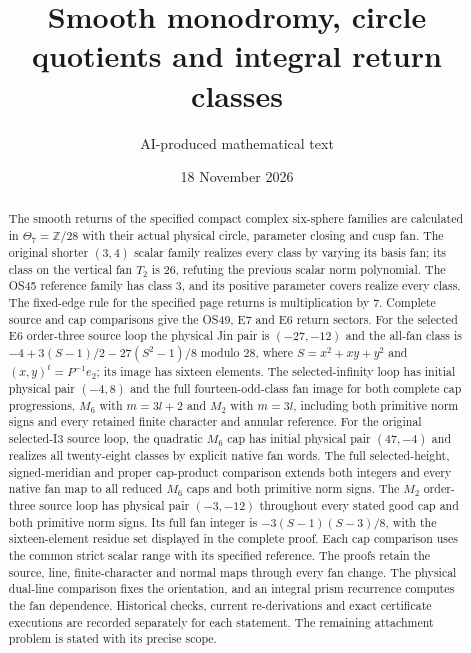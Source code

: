 \title{Smooth monodromy, circle quotients and integral return classes}
\author{AI-produced mathematical text}
\date{18 November 2026}
\maketitle

\begin{abstract}
The smooth returns of the specified compact complex six-sphere
families are calculated in $\Theta_7=\mathbb Z/28$ with their actual
physical circle, parameter closing and cusp fan. The original
shorter $(3,4)$ scalar family realizes every class by varying its
basis fan; its class on the vertical fan $T_2$ is $26$, refuting the
previous scalar norm polynomial. The OS45 reference family has
class $3$, and its positive parameter covers realize every class.
The fixed-edge rule for the specified page returns is multiplication
by $7$. Complete source and cap comparisons give the OS49, E7 and
E6 return sectors. For the selected E6 order-three source loop the
physical Jin pair is $(-27,-12)$ and the all-fan class is
$-4+3(S-1)/2-27(S^2-1)/8$ modulo $28$, where
$S=x^2+xy+y^2$ and $(x,y)^t=P^{-1}e_2$; its image has sixteen elements.
The selected-infinity loop has initial physical pair $(-4,8)$ and
the full fourteen-odd-class fan image for both complete cap
progressions, $M_6$ with $m=3l+2$ and $M_2$ with $m=3l$,
including both primitive norm signs and every retained finite
character and annular reference.
For the original selected-I3 source loop, the quadratic $M_6$
cap has initial physical pair $(47,-4)$ and realizes all
twenty-eight classes by explicit native fan words. The full
selected-height, signed-meridian and proper cap-product comparison
extends both integers and every native fan map to all reduced
$M_6$ caps and both primitive norm signs. The $M_2$
order-three source loop has physical pair $(-3,-12)$ throughout
every stated good cap and both primitive norm signs. Its full
fan integer is $-3(S-1)(S-3)/8$, with the sixteen-element
residue set displayed in the complete proof. Each cap comparison
uses the common strict scalar range with its specified reference.
The proofs retain the source, line, finite-character and normal maps
through every fan change. The physical dual-line comparison fixes
the orientation, and an integral prism recurrence computes the fan
dependence. Historical checks, current re-derivations and exact
certificate executions are recorded separately for each statement.
The remaining attachment problem is stated with its precise scope.
\end{abstract}

